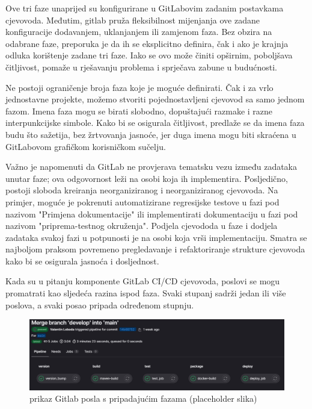 \documentclass[a4paper,12pt,oneside]{article}
\begin{document}
Ove tri faze unaprijed su konfigurirane u GitLabovim zadanim postavkama cjevovoda. Međutim, gitlab pruža fleksibilnost mijenjanja ove zadane konfiguracije dodavanjem, uklanjanjem ili zamjenom faza. Bez obzira na odabrane faze, preporuka je da ih se eksplicitno definira, čak i ako je krajnja odluka korištenje zadane tri faze. Iako se ovo može činiti opširnim, poboljšava čitljivost, pomaže u rješavanju problema i sprječava zabune u budućnosti.

Ne postoji ograničenje broja faza koje je moguće definirati. Čak i za vrlo jednostavne projekte, možemo stvoriti pojednostavljeni cjevovod sa samo jednom fazom. Imena faza mogu se birati slobodno, dopuštajući razmake i razne interpunkcijske simbole. Kako bi se osigurala čitljivost, predlaže se da imena faza budu što  sažetija, bez žrtvovanja jasnoće, jer duga imena mogu biti skraćena u GitLabovom grafičkom korisničkom sučelju.

Važno je napomenuti da GitLab ne provjerava tematsku vezu između zadataka unutar faze; ova odgovornost leži na osobi koja ih implementira. Posljedično, postoji sloboda kreiranja neorganiziranog i neorganiziranog cjevovoda. Na primjer, moguće je pokrenuti automatizirane regresijske testove u fazi pod nazivom "Primjena dokumentacije" ili implementirati dokumentaciju u fazi pod nazivom "priprema-testnog okruženja". Podjela cjevododa u faze i dodjela zadataka svakoj fazi u potpunosti je na osobi koja vrši implementaciju. Smatra se najboljom praksom povremeno pregledavanje i refaktoriranje strukture cjevovoda kako bi se osigurala jasnoća i dosljednost.


Kada su u pitanju komponente GitLab CI/CD cjevovoda, poslovi se mogu promatrati kao sljedeća razina ispod faza. Svaki stupanj sadrži jedan ili više poslova, a svaki posao pripada određenom stupnju.

\begin{figure}[ht!] %
	\centering %
	\includegraphics[scale=0.5]{./Slike/gitlab ci job overview main branch.png} %
	\caption{prikaz Gitlab posla s pripadajućim fazama (placeholder slika) \label{f:prikaz Gitlab posla s pripadajućim fazama}} %
\end{figure}
\end{document}
